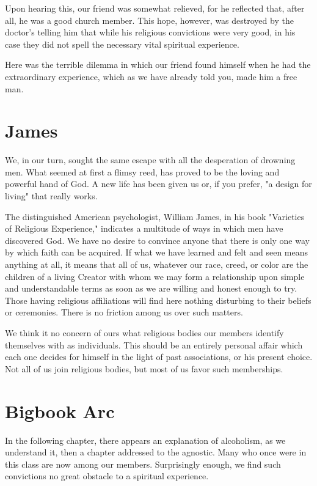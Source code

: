 Upon hearing this, our friend was somewhat relieved, for he reflected that, after all, he was a good church member. 
This hope, however, was destroyed by the doctor's telling him that while his religious convictions were very good, 
in his case they did not spell the necessary vital spiritual experience.

Here was the terrible dilemma in which our friend found himself when he had the extraordinary experience, 
which as we have already told you, made him a free man.


\section{James}

We, in our turn, sought the same escape with all the desperation of drowning men. 
What seemed at first a flimsy reed, has proved to be the loving and powerful hand of God. 
A new life has been given us or, if you prefer, 
"a design for living" that really works.

The distinguished American psychologist, William James, in his book "Varieties of Religious Experience," indicates a multitude of ways in which men have discovered God. 
We have no desire to convince anyone that there is only one way by which faith can be acquired. 
If what we have learned and felt and seen means anything at all, it means that all of us, whatever our race, creed, or color are the children of a living Creator 
with whom we may form a relationship upon simple and understandable terms 
as soon as we are willing and honest enough to try. 
Those having religious affiliations will find here nothing disturbing to their beliefs or ceremonies. 
There is no friction among us over such matters.

We think it no concern of ours what religious bodies our members identify themselves with as individuals. 
This should be an entirely personal affair which each one decides for himself 
in the light of past associations, or his present choice. 
Not all of us join religious bodies, but most of us favor such memberships.


\section{Bigbook Arc}

In the following chapter, there appears an explanation of alcoholism, as we understand it, 
then a chapter addressed to the agnostic. 
Many who once were in this class are now among our members. 
Surprisingly enough, we find such convictions no great obstacle to a spiritual experience.

